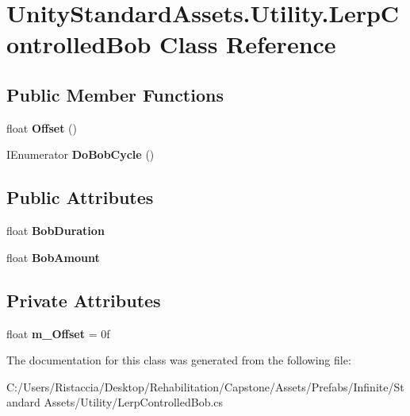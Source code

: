\hypertarget{class_unity_standard_assets_1_1_utility_1_1_lerp_controlled_bob}{}\section{Unity\+Standard\+Assets.\+Utility.\+Lerp\+Controlled\+Bob Class Reference}
\label{class_unity_standard_assets_1_1_utility_1_1_lerp_controlled_bob}
\subsection*{Public Member Functions}
\begin{DoxyCompactItemize}
\item 
\mbox{\label{class_unity_standard_assets_1_1_utility_1_1_lerp_controlled_bob_a6260e516b19ee9440bb22c160d0cbed9}} 
float {\bfseries Offset} ()
\item 
\mbox{\label{class_unity_standard_assets_1_1_utility_1_1_lerp_controlled_bob_a22a2016a4d643696d81fc5e5d0809832}} 
I\+Enumerator {\bfseries Do\+Bob\+Cycle} ()
\end{DoxyCompactItemize}
\subsection*{Public Attributes}
\begin{DoxyCompactItemize}
\item 
\mbox{\label{class_unity_standard_assets_1_1_utility_1_1_lerp_controlled_bob_a7b2e1bb225e6350e7e95617457c2c0e9}} 
float {\bfseries Bob\+Duration}
\item 
\mbox{\label{class_unity_standard_assets_1_1_utility_1_1_lerp_controlled_bob_a877cd224920e669aee363f5acc38c711}} 
float {\bfseries Bob\+Amount}
\end{DoxyCompactItemize}
\subsection*{Private Attributes}
\begin{DoxyCompactItemize}
\item 
\mbox{\label{class_unity_standard_assets_1_1_utility_1_1_lerp_controlled_bob_ad9eca6ec788b9012c06c05a05239665b}} 
float {\bfseries m\+\_\+\+Offset} = 0f
\end{DoxyCompactItemize}


The documentation for this class was generated from the following file\+:\begin{DoxyCompactItemize}
\item 
C\+:/\+Users/\+Ristaccia/\+Desktop/\+Rehabilitation/\+Capstone/\+Assets/\+Prefabs/\+Infinite/\+Standard Assets/\+Utility/Lerp\+Controlled\+Bob.\+cs\end{DoxyCompactItemize}
